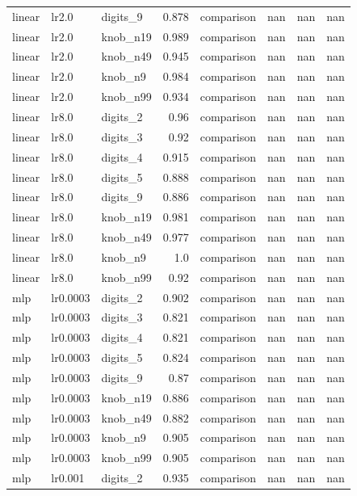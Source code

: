 \begin{table}[t]
\begin{tabular}{lllrrrrr}
linear & lr2.0 & digits\_9 & 0.878 & comparison & nan & nan & nan \\
linear & lr2.0 & knob\_n19 & 0.989 & comparison & nan & nan & nan \\
linear & lr2.0 & knob\_n49 & 0.945 & comparison & nan & nan & nan \\
linear & lr2.0 & knob\_n9 & 0.984 & comparison & nan & nan & nan \\
linear & lr2.0 & knob\_n99 & 0.934 & comparison & nan & nan & nan \\
linear & lr8.0 & digits\_2 & 0.96 & comparison & nan & nan & nan \\
linear & lr8.0 & digits\_3 & 0.92 & comparison & nan & nan & nan \\
linear & lr8.0 & digits\_4 & 0.915 & comparison & nan & nan & nan \\
linear & lr8.0 & digits\_5 & 0.888 & comparison & nan & nan & nan \\
linear & lr8.0 & digits\_9 & 0.886 & comparison & nan & nan & nan \\
linear & lr8.0 & knob\_n19 & 0.981 & comparison & nan & nan & nan \\
linear & lr8.0 & knob\_n49 & 0.977 & comparison & nan & nan & nan \\
linear & lr8.0 & knob\_n9 & 1.0 & comparison & nan & nan & nan \\
linear & lr8.0 & knob\_n99 & 0.92 & comparison & nan & nan & nan \\
mlp & lr0.0003 & digits\_2 & 0.902 & comparison & nan & nan & nan \\
mlp & lr0.0003 & digits\_3 & 0.821 & comparison & nan & nan & nan \\
mlp & lr0.0003 & digits\_4 & 0.821 & comparison & nan & nan & nan \\
mlp & lr0.0003 & digits\_5 & 0.824 & comparison & nan & nan & nan \\
mlp & lr0.0003 & digits\_9 & 0.87 & comparison & nan & nan & nan \\
mlp & lr0.0003 & knob\_n19 & 0.886 & comparison & nan & nan & nan \\
mlp & lr0.0003 & knob\_n49 & 0.882 & comparison & nan & nan & nan \\
mlp & lr0.0003 & knob\_n9 & 0.905 & comparison & nan & nan & nan \\
mlp & lr0.0003 & knob\_n99 & 0.905 & comparison & nan & nan & nan \\
mlp & lr0.001 & digits\_2 & 0.935 & comparison & nan & nan & nan \\

\end{tabular}
\end{table}
